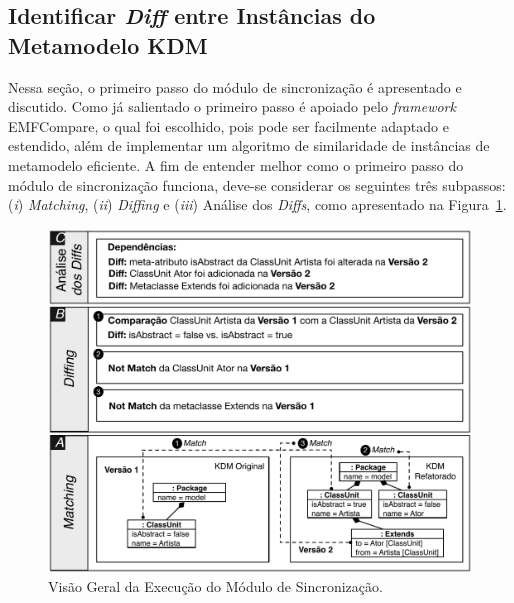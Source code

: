 
\subsection{Identificar \textit{Diff} entre Instâncias do Metamodelo KDM}\label{sec:diff_entre_kdm}

Nessa seção, o primeiro passo do módulo de sincronização é apresentado e discutido. Como já salientado o primeiro passo é apoiado pelo \textit{framework} EMFCompare, o qual foi escolhido, pois pode ser facilmente adaptado e estendido, além de implementar um algoritmo de similaridade de instâncias de metamodelo eficiente. A fim de entender melhor como o primeiro passo do módulo de sincronização funciona, deve-se considerar os seguintes três subpassos: (\textit{i}) \textit{Matching}, (\textit{ii}) \textit{Diffing} e (\textit{iii}) Análise dos \textit{Diffs}, como apresentado na Figura~\ref{fig:diff_emf_compare}. 

\begin{figure}[h]
	\centering
	\caption{Visão Geral da Execução do Módulo de Sincronização.}
	\label{fig:diff_emf_compare}
	\includegraphics[scale=0.7]{images/matching_diffing_analise_3}
	\fautor
\end{figure}

